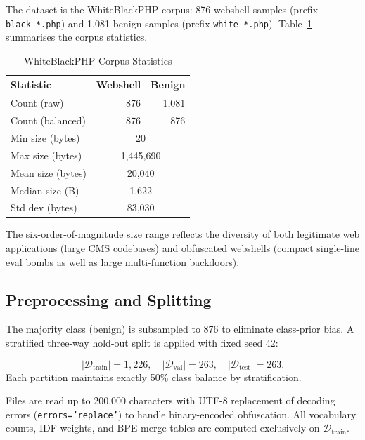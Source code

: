 \documentclass[10pt,conference,letterpaper]{IEEEtran}
\begin{document}
The dataset is the WhiteBlackPHP corpus: 876 webshell samples
(prefix \texttt{black\_*.php}) and 1{,}081 benign samples (prefix
\texttt{white\_*.php}). Table~\ref{tab:dataset} summarises the corpus statistics.

\begin{table}[h]
  \centering
  \caption{WhiteBlackPHP Corpus Statistics}
  \label{tab:dataset}
  \renewcommand{\arraystretch}{1.1}
  \begin{tabular}{lrr}
    \toprule
    \rowcolor{lightblue}
    \textbf{Statistic} & \textbf{Webshell} & \textbf{Benign} \\
    \midrule
    Count (raw)      & 876   & 1{,}081 \\
    \rowcolor{rowblue}
    Count (balanced) & 876   & 876 \\
    Min size (bytes) & \multicolumn{2}{c}{20} \\
    \rowcolor{rowblue}
    Max size (bytes) & \multicolumn{2}{c}{1{,}445{,}690} \\
    Mean size (bytes)& \multicolumn{2}{c}{20{,}040} \\
    \rowcolor{rowblue}
    Median size (B)  & \multicolumn{2}{c}{1{,}622} \\
    Std dev (bytes)  & \multicolumn{2}{c}{83{,}030} \\
    \bottomrule
  \end{tabular}
\end{table}

The six-order-of-magnitude size range reflects the diversity of both legitimate
web applications (large CMS codebases) and obfuscated webshells (compact
single-line eval bombs as well as large multi-function backdoors).

\subsection{Preprocessing and Splitting}

The majority class (benign) is subsampled to 876 to eliminate class-prior bias.
A stratified three-way hold-out split is applied with fixed seed 42:
\begin{tcolorbox}[eqbox]
\[
  |\mathcal{D}_\text{train}| = 1{,}226,\quad
  |\mathcal{D}_\text{val}|   = 263,\quad
  |\mathcal{D}_\text{test}|  = 263.
\]
Each partition maintains exactly 50\% class balance by stratification.
\end{tcolorbox}

Files are read up to 200{,}000 characters with UTF-8 replacement of decoding
errors (\texttt{errors='replace'}) to handle binary-encoded obfuscation. All
vocabulary counts, IDF weights, and BPE merge tables are computed exclusively
on $\mathcal{D}_\text{train}$.
\end{document}
